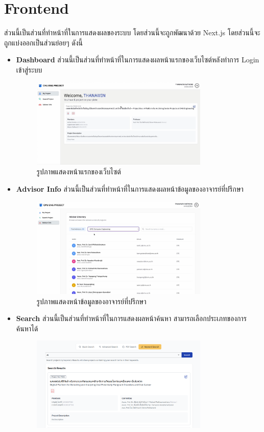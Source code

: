 \section{Frontend}
\hspace{1.27cm} \raggedright ส่วนนี้เป็นส่วนที่ทำหน้าที่ในการแสดงผลของระบบ โดยส่วนนี้จะถูกพัฒนาด้วย Next.js โดยส่วนนี้จะถูกแบ่งออกเป็นส่วนย่อยๆ ดังนี้
\begin{itemize}
  \item \textbf{Dashboard} ส่วนนี้เป็นส่วนที่ทำหน้าที่ในการแสดงผลหน้าแรกของเว็บไซต์หลังทำการ Login เข้าสู่ระบบ
  \begin{figure}[H]
    \centering
    \includegraphics[width=0.8\textwidth]{pictures/project_box/dashboard.png}
    \caption{รูปภาพแสดงหน้าแรกของเว็บไซต์}
    \label{fig:dashboard}
  \end{figure}
  \item \textbf{Advisor Info} ส่วนนี้เป็นส่วนที่ทำหน้าที่ในการแสดงผลหน้าข้อมูลของอาจารย์ที่ปรึกษา
  \begin{figure}[H]
    \centering
    \includegraphics[width=0.8\textwidth]{pictures/project_box/advisor_info.png}
    \caption{รูปภาพแสดงหน้าข้อมูลของอาจารย์ที่ปรึกษา}
    \label{fig:advisor_info}
  \end{figure}
  \item \textbf{Search} ส่วนนี้เป็นส่วนที่ทำหน้าที่ในการแสดงผลหน้าค้นหา สามารถเลือกประเภทของการค้นหาได้
  \begin{figure}[H]
    \centering
    \includegraphics[width=0.8\textwidth]{pictures/project_box/keyword_search.png}
    

\end{figure}
\end{itemize}
